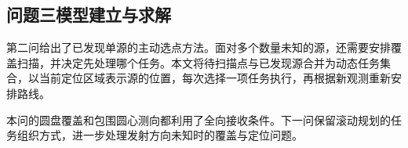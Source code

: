 \subsection{问题三模型建立与求解}\label{sec:q3}

第二问给出了已发现单源的主动选点方法。面对多个数量未知的源，还需要安排覆盖扫描，并决定先处理哪个任务。本文将待扫描点与已发现源合并为动态任务集合，以当前定位区域表示源的位置，每次选择一项任务执行，再根据新观测重新安排路线。

%
%
%
%
%
%
%

本问的圆盘覆盖和包围圆心测向都利用了全向接收条件。下一问保留滚动规划的任务组织方式，进一步处理发射方向未知时的覆盖与定位问题。
